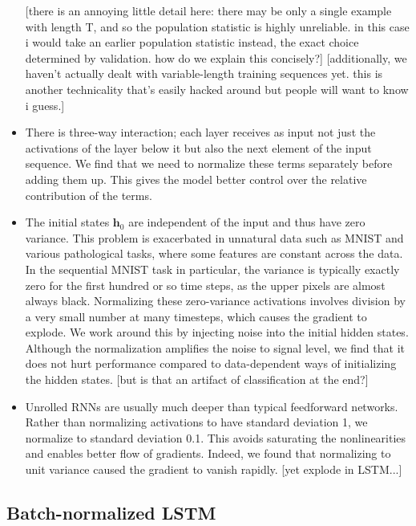 \documentclass{article} %
\newcommand{\vect}[1]{\mathbf{#1}}
\begin{document}
\begin{itemize}
[there is an annoying little detail here: there may be only a single example with length T, and so the population statistic is highly unreliable. in this case i would take an earlier population statistic instead, the exact choice determined by validation. how do we explain this concisely?]
[additionally, we haven't actually dealt with variable-length training sequences yet. this is another technicality that's easily hacked around but people will want to know i guess.]
\\ \item
There is three-way interaction; each layer receives as input not just the activations of the layer below it but also the next element of the input sequence.
We find that we need to normalize these terms separately before adding them up.
This gives the model better control over the relative contribution of the terms.
\\ \item
The initial states $\vect{h}_0$ are independent of the input and thus have zero variance.
This problem is exacerbated in unnatural data such as MNIST and various pathological tasks, where some features are constant across the data.
In the sequential MNIST task in particular, the variance is typically exactly zero for the first hundred or so time steps, as the upper pixels are almost always black.
Normalizing these zero-variance activations involves division by a very small number at many timesteps, which causes the gradient to explode.
We work around this by injecting noise into the initial hidden states.
Although the normalization amplifies the noise to signal level, we find that it does not hurt performance compared to data-dependent ways of initializing the hidden states.
[but is that an artifact of classification at the end?]
\\ \item
Unrolled RNNs are usually much deeper than typical feedforward networks.
Rather than normalizing activations to have standard deviation 1, we normalize to standard deviation 0.1.
This avoids saturating the nonlinearities and enables better flow of gradients.
Indeed, we found that normalizing to unit variance caused the gradient to vanish rapidly.
[yet explode in LSTM...]
\end{itemize}

\subsection{Batch-normalized LSTM}
\end{document}
